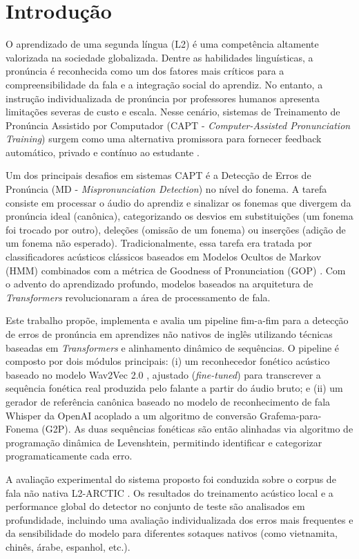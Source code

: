 \documentclass[12pt]{article}
\begin{document}
\section{Introdução}
O aprendizado de uma segunda língua (L2) é uma competência altamente valorizada na sociedade globalizada. Dentre as habilidades linguísticas, a pronúncia é reconhecida como um dos fatores mais críticos para a compreensibilidade da fala e a integração social do aprendiz. No entanto, a instrução individualizada de pronúncia por professores humanos apresenta limitações severas de custo e escala. Nesse cenário, sistemas de Treinamento de Pronúncia Assistido por Computador (CAPT - \textit{Computer-Assisted Pronunciation Training}) surgem como uma alternativa promissora para fornecer feedback automático, privado e contínuo ao estudante \cite{witt2000phone}.

Um dos principais desafios em sistemas CAPT é a Detecção de Erros de Pronúncia (MD - \textit{Mispronunciation Detection}) no nível do fonema. A tarefa consiste em processar o áudio do aprendiz e sinalizar os fonemas que divergem da pronúncia ideal (canônica), categorizando os desvios em substituições (um fonema foi trocado por outro), deleções (omissão de um fonema) ou inserções (adição de um fonema não esperado). Tradicionalmente, essa tarefa era tratada por classificadores acústicos clássicos baseados em Modelos Ocultos de Markov (HMM) combinados com a métrica de Goodness of Pronunciation (GOP) \cite{witt2000phone}. Com o advento do aprendizado profundo, modelos baseados na arquitetura de \textit{Transformers} revolucionaram a área de processamento de fala.

Este trabalho propõe, implementa e avalia um pipeline fim-a-fim para a detecção de erros de pronúncia em aprendizes não nativos de inglês utilizando técnicas baseadas em \textit{Transformers} e alinhamento dinâmico de sequências. O pipeline é composto por dois módulos principais: (i) um reconhecedor fonético acústico baseado no modelo Wav2Vec 2.0 \cite{baevski2020wav2vec}, ajustado (\textit{fine-tuned}) para transcrever a sequência fonética real produzida pelo falante a partir do áudio bruto; e (ii) um gerador de referência canônica baseado no modelo de reconhecimento de fala Whisper da OpenAI \cite{radford2023robust} acoplado a um algoritmo de conversão Grafema-para-Fonema (G2P). As duas sequências fonéticas são então alinhadas via algoritmo de programação dinâmica de Levenshtein, permitindo identificar e categorizar programaticamente cada erro.

A avaliação experimental do sistema proposto foi conduzida sobre o corpus de fala não nativa L2-ARCTIC \cite{zhao2018l2}. Os resultados do treinamento acústico local e a performance global do detector no conjunto de teste são analisados em profundidade, incluindo uma avaliação individualizada dos erros mais frequentes e da sensibilidade do modelo para diferentes sotaques nativos (como vietnamita, chinês, árabe, espanhol, etc.).
\end{document}
